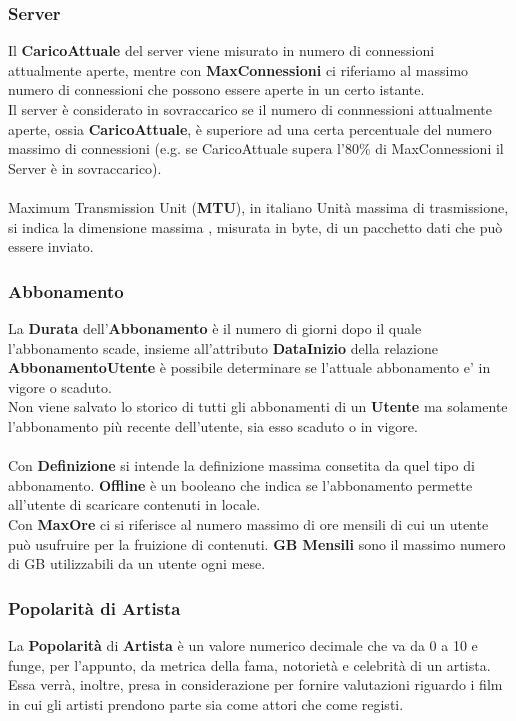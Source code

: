\documentclass{article}
\begin{document}
\subsubsection{Server}
Il \textbf{CaricoAttuale} del server viene misurato in numero di connessioni attualmente aperte, mentre con \textbf{MaxConnessioni} ci riferiamo al massimo numero di connessioni che possono essere aperte in un certo istante. \\ 
Il server è considerato in sovraccarico se il numero di connnessioni attualmente aperte, ossia \textbf{CaricoAttuale}, è superiore ad una certa percentuale del numero massimo di connessioni (e.g. se CaricoAttuale supera l'80\% di MaxConnessioni il Server è in sovraccarico). \\ \\ 
Maximum Transmission Unit (\textbf{MTU}), in italiano Unità massima di trasmissione, si indica la dimensione massima , misurata in byte, di un pacchetto dati che può essere inviato.
%
%
%
%
%
%
%
%
\subsubsection{Abbonamento}
La \textbf{Durata} dell'\textbf{Abbonamento} è il numero di giorni dopo il quale l'abbonamento scade, insieme all'attributo \textbf{DataInizio} della relazione \textbf{AbbonamentoUtente} è possibile determinare se l'attuale abbonamento e' in vigore o scaduto. \\
Non viene salvato lo storico di tutti gli abbonamenti di un \textbf{Utente} ma solamente l'abbonamento più recente dell'utente, sia esso scaduto o in vigore. \\ \\ 
Con \textbf{Definizione} si intende la definizione massima consetita da quel tipo di abbonamento. \textbf{Offline} è un booleano che indica se l'abbonamento permette all'utente di scaricare contenuti in locale. \\
Con \textbf{MaxOre} ci si riferisce al numero massimo di ore mensili di cui un utente può usufruire per la fruizione di contenuti. \textbf{GB Mensili} sono il massimo numero di GB utilizzabili da un utente ogni mese.

\subsubsection{Popolarità di Artista}
La \textbf{Popolarità} di \textbf{Artista} è un valore numerico decimale che va da 0 a 10 e funge, per l'appunto, da metrica della fama, notorietà e celebrità di un artista. \\ 
Essa verrà, inoltre, presa in considerazione per fornire valutazioni riguardo i film in cui gli artisti prendono parte sia come attori che come registi.
\end{document}
